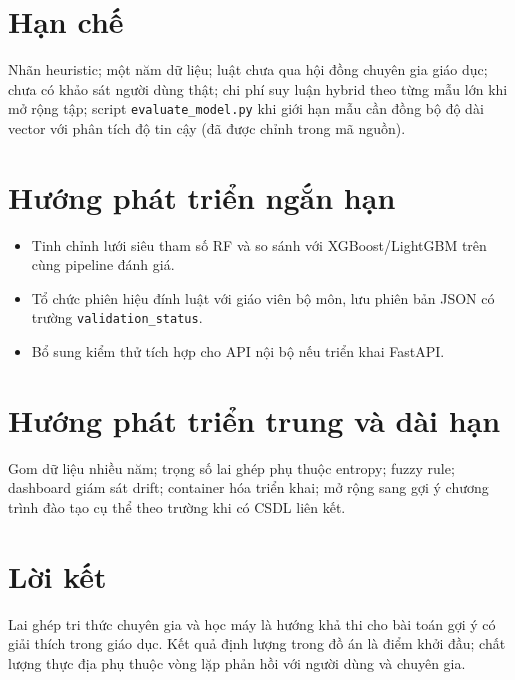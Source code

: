 \section{Hạn chế}
Nhãn heuristic; một năm dữ liệu; luật chưa qua hội đồng chuyên gia giáo dục; chưa có khảo sát người dùng thật; chi phí suy luận hybrid theo từng mẫu lớn khi mở rộng tập; script \texttt{evaluate\_model.py} khi giới hạn mẫu cần đồng bộ độ dài vector với phân tích độ tin cậy (đã được chỉnh trong mã nguồn).

\section{Hướng phát triển ngắn hạn}
\begin{itemize}[leftmargin=*]
  \item Tinh chỉnh lưới siêu tham số RF và so sánh với XGBoost/LightGBM trên cùng pipeline đánh giá.
  \item Tổ chức phiên hiệu đính luật với giáo viên bộ môn, lưu phiên bản JSON có trường \texttt{validation\_status}.
  \item Bổ sung kiểm thử tích hợp cho API nội bộ nếu triển khai FastAPI.
\end{itemize}

\section{Hướng phát triển trung và dài hạn}
Gom dữ liệu nhiều năm; trọng số lai ghép phụ thuộc entropy; fuzzy rule; dashboard giám sát drift; container hóa triển khai; mở rộng sang gợi ý chương trình đào tạo cụ thể theo trường khi có CSDL liên kết.

\section{Lời kết}
Lai ghép tri thức chuyên gia và học máy là hướng khả thi cho bài toán gợi ý có giải thích trong giáo dục. Kết quả định lượng trong đồ án là điểm khởi đầu; chất lượng thực địa phụ thuộc vòng lặp phản hồi với người dùng và chuyên gia.
